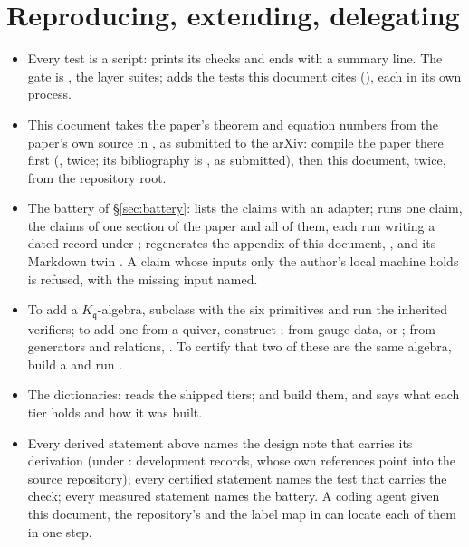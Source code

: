 \documentclass[11pt]{amsart}
\newcommand\fq{\mathfrak{q}}
\theoremstyle{remark}
\begin{document}
\section{Reproducing, extending, delegating}
\begin{itemize}[leftmargin=*]
  \item Every test is a script: 
    prints its checks and ends with a summary line.  The gate is
    , the layer suites; 
    adds the tests this document cites (), each in
    its own process.
  \item This document takes the paper's theorem and equation numbers from
    the paper's own source in , as submitted to the arXiv:
    compile the paper there first (, twice; its
    bibliography is , as submitted), then this document,
    twice, from the repository root.
  \item The battery of \S\ref{sec:battery}: 
    lists the claims with an adapter;  runs one claim,
     the claims of one section of the paper and
     all of them, each run writing a dated record
    under ; 
    regenerates the appendix of this document,
    , and its Markdown twin
    .  A claim whose inputs only the author's
    local machine holds is refused, with the missing input named.
  \item To add a $K_\fq$-algebra, subclass  with the six
    primitives and run the inherited verifiers; to add one from a quiver,
    construct ; from gauge data, 
    or ; from generators and relations,
    .  To certify that two of these are the same
    algebra, build a  and run .
  \item The dictionaries:  reads the shipped tiers;
     and
     build them, and
     says what each tier holds and how it was
    built.
  \item Every derived statement above names the design note that carries
    its derivation (under : development records, whose own
    references point into the source repository); every certified
    statement names the test that carries the check; every measured
    statement names the battery.  A coding agent given this document, the
    repository's  and the label map in
     can locate each of them in one step.
\end{itemize}
\end{document}
